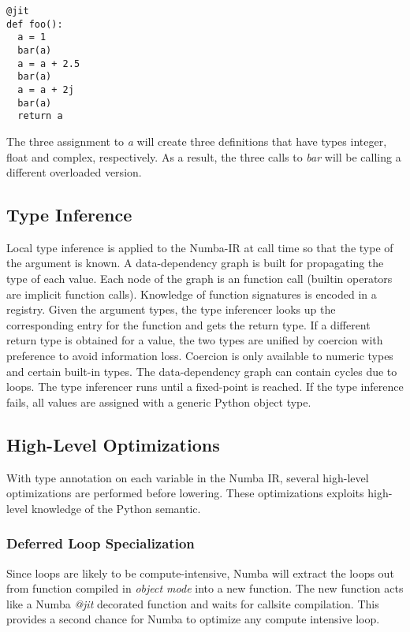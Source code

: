 \documentclass{acm_proc_article-sp}
\begin{document}
\begin{lstlisting}
@jit
def foo():
  a = 1
  bar(a)
  a = a + 2.5
  bar(a)
  a = a + 2j
  bar(a)
  return a
\end{lstlisting}

The three assignment to \textit{a} will create three definitions that have
types integer, float and complex, respectively.  As a result, the three
calls to \textit{bar} will be calling a different overloaded version.

\subsection{Type Inference}

Local type inference is applied to the Numba-IR at call time so that
the type of the argument is known. A data-dependency graph is built for
propagating the type of each value.  Each node of the graph is an function call
(builtin operators are implicit function calls). Knowledge of function
signatures is encoded in a registry.
Given the argument types, the type inferencer looks up
the corresponding entry for the function and gets the return type. If a
different return type is obtained for a value, the two types are unified by
coercion with preference to avoid information loss. Coercion is only available
to numeric types and certain built-in types. The data-dependency graph can
contain cycles due to loops. The type inferencer runs until a fixed-point is
reached. If the type inference fails, all values are assigned with a generic
Python object type.

\subsection{High-Level Optimizations}

With type annotation on each variable in the Numba IR, several high-level
optimizations are performed before lowering. These optimizations exploits
high-level knowledge of the Python semantic.

\subsubsection{Deferred Loop Specialization}

Since loops are likely to be compute-intensive, Numba will extract the loops
out from function compiled in \textit{object mode} into a new function.
The new function acts like a Numba \textit{@jit} decorated function and
waits for callsite compilation. This provides a second chance for Numba to
optimize any compute intensive loop.
\end{document}
